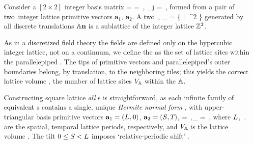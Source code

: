 \documentclass[11pt,a4paper]{article}
\begin{document}
Consider a $[2\!\times\!2]$ integer basis matrix  \beq 
{} =  
= \left[
\begin{array}{cc}
	{a}_{1,1} & {a}_{2,1}\cr
	{a}_{1,2} & {a}_{2,2}
\end{array}
\right]
\,,\quad
{}_{j} = \left[ \begin{array}{c} {a}_{j,1} \cr {a}_{j,2} 
\end{array} \right]
\,, 
formed from a pair of two\dmn\ integer lattice 
primitive vectors $\mathbf{a}_{1}$, $\mathbf{a}_{2}$. 
A two\dmn\ {\em {\Blatt}}, 
\beq 
\lattice_ = 
\left\{   \,|\, \in {}^2 \right\} 
generated by all discrete translations 
\( 
\mathbb{A}  \mathbf{n} 
\) 
is a sublattice of the integer lattice $\mathbb{Z}^2$. 

As in a discretized field theory the fields are defined only on the 
hypercubic integer lattice, not on a continuum, we define the {\em	\pcell} 
as the set of lattice sites within the 
parallelepiped .
The  tips of primitive vectors and parallelepiped's outer boundaries belong, 
by translation, to the neighboring tiles; this yields the correct lattice 
{volume} , the number of lattice sites ${V}_{\mathbb{A}}$ 
within the {\pcell} $\mathbb{A}$. 


Constructing  square lattice 
\emph{all} {\Blatt}s is straightforward, as each  infinite 
family of equivalent {\pcell}s contains a single, unique \emph{Hermite 
	normal form} {\pcell}, with upper-triangular basis primitive 
vectors $\mathbf{a}_1=({L_{}}, 0)$, 
$\mathbf{a}_2=({S_{}},{T_{}})$, 
\beq 
{} = 
\,,\qquad \vol_ = \speriod{} \period{}
\,, 
where ${L_{}}$, $\period{}$ are the spatial, 
temporal lattice periods, respectively, and ${V}_{\mathbb{A}}$ is the 
lattice {volume} . The tilt 
$0 \leq {\ensuremath{S_{}}}<{L_{}}$ imposes `relative-periodic shift' 
{\bcs}. 
\end{document}
